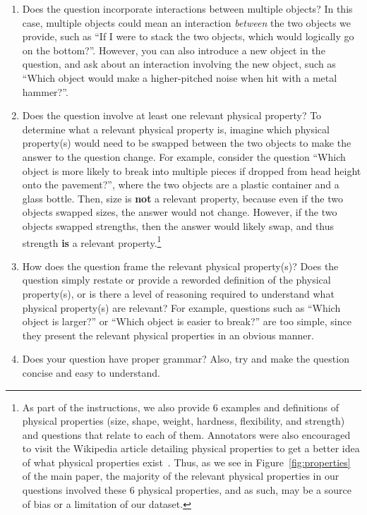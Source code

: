 \documentclass[runningheads]{llncs}
\begin{document}
\begin{enumerate}
    \item Does the question incorporate interactions between multiple objects? In this case, multiple objects could mean an interaction \textit{between} the two objects we provide, such as ``If I were to stack the two objects, which would logically go on the bottom?''. However, you can also introduce a new object in the question, and ask about an interaction involving the new object, such as ``Which object would make a higher-pitched noise when hit with a metal hammer?''. 
    \item Does the question involve at least one relevant physical property? To determine what a relevant physical property is, imagine which physical property(s) would need to be swapped between the two objects to make the answer to the question change. For example, consider the question ``Which object is more likely to break into multiple pieces if dropped from head height onto the pavement?'', where the two objects are a plastic container and a glass bottle. Then, size is \textbf{not} a relevant property, because even if the two objects swapped sizes, the answer would not change. However, if the two objects swapped strengths, then the answer would likely swap, and thus strength \textbf{is} a relevant property.\footnote{As part of the instructions, we also provide 6 examples and definitions of physical properties (size, shape, weight, hardness, flexibility, and strength) and questions that relate to each of them. Annotators were also encouraged to visit the Wikipedia article detailing physical properties to get a better idea of what physical properties exist~\cite{wikipediaphysicalprops}. Thus, as we see in Figure~\ref{fig:properties} of the main paper, the majority of the relevant physical properties in our questions involved these 6 physical properties, and as such, may be a source of bias or a limitation of our dataset.}
    \item How does the question frame the relevant physical property(s)? Does the question simply restate or provide a reworded definition of the physical property(s), or is there a level of reasoning required to understand what physical property(s) are relevant? For example, questions such as ``Which object is larger?'' or ``Which object is easier to break?'' are too simple, since they present the relevant physical properties in an obvious manner.
    \item Does your question have proper grammar? Also, try and make the question concise and easy to understand.
\end{enumerate}
\end{document}
